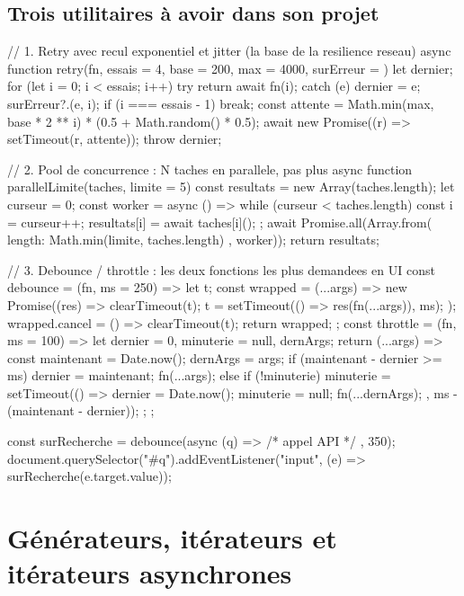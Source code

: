 \subsection{Trois utilitaires \`a avoir dans son projet}

\begin{codejs}
// 1. Retry avec recul exponentiel et jitter (la base de la resilience reseau)
async function retry(fn, { essais = 4, base = 200, max = 4000, surErreur } = {}) {
  let dernier;
  for (let i = 0; i < essais; i++) {
    try { return await fn(i); }
    catch (e) {
      dernier = e;
      surErreur?.(e, i);
      if (i === essais - 1) break;
      const attente = Math.min(max, base * 2 ** i) * (0.5 + Math.random() * 0.5);
      await new Promise((r) => setTimeout(r, attente));
    }
  }
  throw dernier;
}

// 2. Pool de concurrence : N taches en parallele, pas plus
async function parallelLimite(taches, limite = 5) {
  const resultats = new Array(taches.length);
  let curseur = 0;
  const worker = async () => {
    while (curseur < taches.length) {
      const i = curseur++;
      resultats[i] = await taches[i]();
    }
  };
  await Promise.all(Array.from({ length: Math.min(limite, taches.length) }, worker));
  return resultats;
}

// 3. Debounce / throttle : les deux fonctions les plus demandees en UI
const debounce = (fn, ms = 250) => {
  let t;
  const wrapped = (...args) => new Promise((res) => {
    clearTimeout(t);
    t = setTimeout(() => res(fn(...args)), ms);
  });
  wrapped.cancel = () => clearTimeout(t);
  return wrapped;
};
const throttle = (fn, ms = 100) => {
  let dernier = 0, minuterie = null, dernArgs;
  return (...args) => {
    const maintenant = Date.now();
    dernArgs = args;
    if (maintenant - dernier >= ms) { dernier = maintenant; fn(...args); }
    else if (!minuterie) minuterie = setTimeout(() => {
      dernier = Date.now(); minuterie = null; fn(...dernArgs);
    }, ms - (maintenant - dernier));
  };
};

const surRecherche = debounce(async (q) => { /* appel API */ }, 350);
document.querySelector("#q").addEventListener("input", (e) => surRecherche(e.target.value));
\end{codejs}

\section{G\'en\'erateurs, it\'erateurs et it\'erateurs asynchrones}


